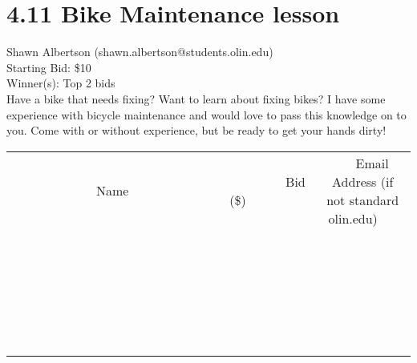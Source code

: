 \documentclass[11pt]{article}
\begin{document}
\section*{4.11 Bike Maintenance lesson}
Shawn Albertson (shawn.albertson@students.olin.edu) \\
Starting Bid: \$10 \\
Winner(s): 
Top 2 bids \\
Have a bike that needs fixing? Want to learn about fixing bikes? I have some experience with bicycle maintenance and would love to pass this knowledge on to you. Come with or without experience, but be ready to get your hands dirty! \\[6ex]
\begin{tabular}{c c c}
~~~~~~~~~~~~~Name~~~~~~~~~~~~~ & ~~~~~~~~~Bid (\$)~~~~~~~~~ & ~~~Email Address (if not standard olin.edu)~~~ \\
 & & \\
\hline
 & & \\
\hline
 & & \\
\hline
 & & \\
\hline
 & & \\
\hline
 & & \\
\hline
 & & \\
\hline
 & & \\
\hline
 & & \\
\hline
 & & \\
\hline
 & & \\
\hline
 & & \\
\hline
 & & \\
\hline
 & & \\
\hline
 & & \\
\hline
 & & \\
\hline
 & & \\
\hline
 & & \\
\hline
 & & \\
\hline
 & & \\
\hline
 & & \\
\hline
 & & \\
\hline
 & & \\
\hline
 & & \\
\hline
 & & \\
\hline
 & & \\
\hline
\end{tabular}
\clearpage
\end{document}
